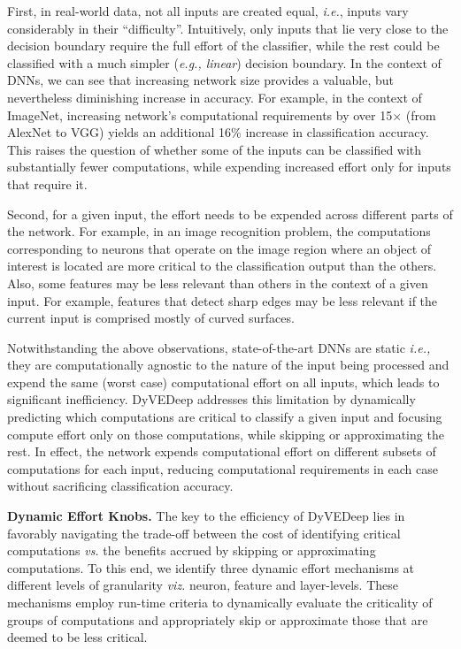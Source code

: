 \documentclass{article} %
\begin{document}
First, in real-world data, not all inputs are created equal, {\em i.e.}, inputs vary considerably in their ``difficulty''. Intuitively, only  inputs that lie very close to the decision boundary require the full effort of the classifier, while the rest could be classified with a much simpler (\emph{e.g., linear}) decision boundary. In the context of DNNs, we can see that increasing network size provides a valuable, but nevertheless diminishing increase in accuracy. For example, in the context of ImageNet, increasing network's computational requirements by over 15$\times$ (from AlexNet to VGG) yields an additional 16\% increase in classification accuracy. This raises the question of whether some of the inputs can be classified with substantially fewer computations, while expending increased effort only for inputs that require it.

Second, for a given input, the effort needs to be expended across different parts of the network. For example, in an image recognition problem, the computations corresponding to neurons that operate on the image region where an object of interest is located are more critical to the classification output than the others. Also, some features may be less relevant than others in the context of a given input. For example, features that detect sharp edges may be less relevant if the current input is comprised mostly of curved surfaces.

Notwithstanding the above observations, state-of-the-art DNNs are static \emph{i.e.,} they are computationally agnostic to the nature of the input being processed and expend the same (worst case) computational effort on all inputs, which leads to significant inefficiency. DyVEDeep addresses this limitation by dynamically predicting which computations are critical to classify a given input and focusing compute effort only on those computations, while skipping or approximating the rest. In effect, the network expends computational effort on different subsets of computations for each input, reducing computational requirements in each case without sacrificing classification accuracy.

{\bf \noindent Dynamic Effort Knobs.} The key to the efficiency of DyVEDeep lies in favorably navigating the trade-off between the cost of identifying critical computations \emph{vs.} the benefits accrued by skipping or approximating computations. To this end, we identify three dynamic effort mechanisms at different levels of granularity \emph{viz.} neuron, feature and layer-levels. These mechanisms employ run-time criteria to dynamically evaluate the criticality of groups of computations and appropriately skip or approximate those that are deemed to be less critical.
\end{document}

